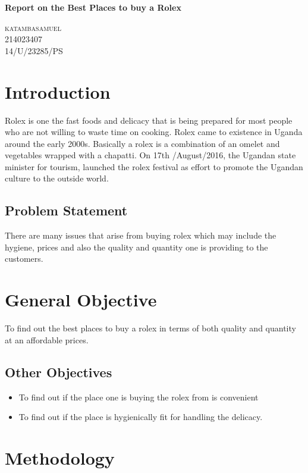 \documentclass[12]{article}
\begin{document}
\begin{titlepage}
\huge{\bfseries Report on the Best Places to buy a Rolex}\\
\begin{flushright}
\textsc{\LARGE katambasamuel \\
214023407 \\
14/U/23285/PS\\
}
\end{flushright}
\end{titlepage}
\section{Introduction}
Rolex is one the fast foods and delicacy that is being prepared for most people who are not willing to waste time on cooking. Rolex came to existence in Uganda around the early 2000s. Basically a rolex is a combination of an omelet and vegetables wrapped with a chapatti. On 17th /August/2016, the Ugandan state minister for tourism, launched the rolex festival as effort to promote the Ugandan culture to the outside world.
\subsection{Problem Statement}
There are many issues that arise from buying rolex which may include the hygiene, prices and also the quality and quantity one is providing to the customers.
\section{General Objective}
To find out the best places to buy a rolex in terms of both quality and quantity at an affordable prices.
\subsection{Other Objectives}
\begin{itemize}
  \item To find out if the place one is buying the rolex from is convenient
  \item To find out if the place is hygienically fit for handling the delicacy.
\end{itemize}
		
\section{Methodology}
\end{document}
